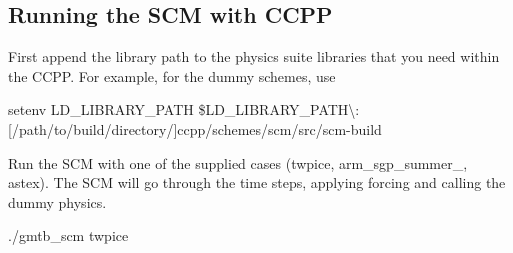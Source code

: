 \subsection*{Running the S\+CM with C\+C\+PP}


\begin{DoxyEnumerate}
\item First append the library path to the physics suite libraries that you need within the C\+C\+PP. For example, for the dummy schemes, use
\end{DoxyEnumerate}
\begin{DoxyItemize}
\item {\ttfamily setenv L\+D\+\_\+\+L\+I\+B\+R\+A\+R\+Y\+\_\+\+P\+A\+TH \$\+L\+D\+\_\+\+L\+I\+B\+R\+A\+R\+Y\+\_\+\+P\+A\+TH\textbackslash{}\+:\mbox{[}/path/to/build/directory/\mbox{]}ccpp/schemes/scm/src/scm-\/build}
\end{DoxyItemize}
\begin{DoxyEnumerate}
\item Run the S\+CM with one of the supplied cases (twpice, arm\+\_\+sgp\+\_\+summer\+\_, astex). The S\+CM will go through the time steps, applying forcing and calling the dummy physics.
\end{DoxyEnumerate}
\begin{DoxyItemize}
\item {\ttfamily ./gmtb\+\_\+scm twpice} 
\end{DoxyItemize}